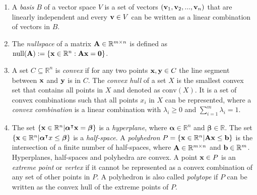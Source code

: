 \begin{enumerate}
    \item A \textit{basis} $B$ of a vector space $V$ is a set of vectors $(\bold v_1, \bold v_2, ..., \bold v_n)$ that are linearly independent and every $\bold v \in V$ can be written as a linear combination of vectors in $B$.

    \item The \textit{nullspace} of a matrix $\bold A \in \mathbb{R}^{m \times n}$ is defined as $\text{null}(\bold A):=\{\bold x \in \mathbb{R}^n: \bold A \bold x = \bold 0\}$. 
    
    \item A set $C \subseteq \mathbb{R}^n$ is \textit{convex} if for any two points $\bold x, \bold y \in C$ the line segment between $\bold x$ and $\bold y$ is in $C$. %
    The \textit{convex hull} of a set $X$ is the smallest convex set that contains all points in $X$ and denoted as $\text{conv}(X)$. It is a set of convex combinations such that all points $x_i$ in $X$ can be represented, where a \textit{convex combination} is a linear combination with $\lambda_i \geq 0$ and $\sum_{i=1}^m \lambda_i = 1$.
    
    \item The set $\{\bold x \in \mathbb{R}^n | \boldsymbol \alpha^\intercal \bold x = \boldsymbol \beta \}$ is a \textit{hyperplane}, where $\boldsymbol \alpha \in \mathbb{R}^n$ and $\boldsymbol \beta \in \mathbb{R}$. The set $\{\bold x \in \mathbb{R}^n | \boldsymbol \alpha^\intercal x \leq \boldsymbol \beta \}$ is a \textit{half-space}. %
    A \textit{polyhedron} $P = \{ \bold x \in \mathbb{R}^n | \bold A \bold x \leq \bold b\}$ is the intersection of a finite number of half-spaces, where $\bold A \in \mathbb{R}^{m \times n}$ and $\bold b \in \mathbb{R}^m$. Hyperplanes, half-spaces and polyhedra are convex. A point $\bold x \in P$ is an \textit{extreme point} or \textit{vertex} if it cannot be represented as a convex combination of any set of other points in $P$. %
    A polyhedron is also called \textit{polytope} if $P$ can be written as the convex hull of the extreme points of $P$. 


\end{enumerate}
